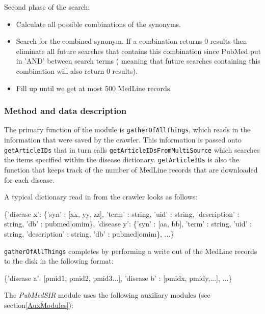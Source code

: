 Second phase of the search:
\begin{itemize}

\item Calculate all possible combinations of the synonyms.

\item Search for the combined synonym. If a combination returns 0
  results then eliminate all future searches that contains this
  combination since PubMed put in 'AND' between search terms ( meaning
  that future searches containing this combination will also return 0
  results).

\item Fill up until we get at most 500 MedLine records.

\end{itemize}

\subsubsection{Method and data description}
The primary function of the module is \texttt{gatherOfAllThings},
which reads in the information that were saved by the crawler. This
information is passed onto \texttt{getArticleIDs} that in turn calls
\texttt{getArticleIDsFromMultiSource} which searches the items
specified within the disease dictionary. \texttt{getArticleIDs} is
also the function that keeps track of the number of MedLine records
that are downloaded for each disease.

A typical dictionary read in from the crawler looks as follows:

\begin{center}
{\small
\{'disease x': \{'syn' : [xx, yy, zz], 'term' : string, 'uid' : string,
    'description' : string, 'db' : pubmed|omim\}, 'disease y': \{'syn' :
    [aa, bb], 'term' : string, 'uid' : string, 'description' : string,
    'db' : pubmed|omim\}, ...\}
}
\end{center}

\texttt{gatherOfAllThings} completes by performing a write out of the
MedLine records to the disk in the following format:

\begin{center}
{\small
\{'disease a': [pmid1, pmid2, pmid3...], 'disease b' : [pmidx,
    pmidy,...], ...\}
}
\end{center}

The \textit{PubMedSIR} module uses the following auxiliary modules
(see section\ref{AuxModules}):

